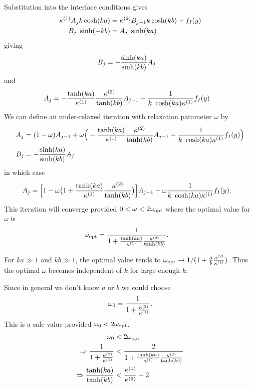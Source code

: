 \documentclass[11pt]{article}
\begin{document}
Substitution into the interface conditions gives
\begin{align*}
   \kappa^{(1)} A_j k \cosh(ka) &=   \kappa^{(2)} B_{j-1} k \cosh(kb) +f_I(y)  \\
    B_j~\sinh(-kb) &= A_j~\sinh(ka)
\end{align*}
giving
\begin{align*}
   B_j &= - {\sinh(ka)\over\sinh(kb)} A_j 
\end{align*}
and 
\begin{align*}
   A_j &= - {\tanh(ka)\over\kappa^{(1)}}{\kappa^{(2)}\over\tanh(kb)} A_{j-1} + {1\over  k~\cosh(ka)\kappa^{(1)}} f_I(y)
\end{align*}
We can define an under-relaxed iteration with relaxation parameter $\omega$ by 
\begin{align*}
   A_j &= (1-\omega)A_{j-1} + 
                  \omega \Big( - {\tanh(ka)\over\kappa^{(1)}}{\kappa^{(2)}\over\tanh(kb)} A_{j-1} + {1\over  k~\cosh(ka)\kappa^{(1)}} f_I(y) \Big) \\
    B_j &= - {\sinh(ka)\over\sinh(kb)} A_j 
\end{align*}
in which case
\begin{align*}
   A_j &= \Big[ 1 -\omega\big(1+{\tanh(ka)\over\kappa^{(1)}}{\kappa^{(2)}\over\tanh(kb)}\big) \Big] A_{j-1} -
                         \omega{ {1\over  k~\cosh(ka)\kappa^{(1)}} f_I(y) }.
\end{align*}
This iteration will converge provided $0< \omega < 2\omega_{\rm opt}$ where
the optimal value for $\omega$ is
\begin{align*}
   \omega_{\rm opt} &= {1 \over 1+{\tanh(ka)\over\kappa^{(1)}}{\kappa^{(2)}\over\tanh(kb)} }.
\end{align*}

For $ka\gg 1 $ and $kb\gg 1$,  the optimal value tends to $\omega_{\rm opt} \rightarrow 1/(1+\frac{a}{b}\frac{\kappa^{(2)}}{\kappa^{(1)}})$.
Thus the optimal $\omega$ becomes independent of $k$ for large enough $k$. 


Since in general we don't know $a$ or $b$ we could choose
\[
   \omega_0 = {1 \over 1+\frac{\kappa^{(2)}}{\kappa^{(1)}} }.
\]
This is a safe value provided $\omega_0< 2\omega_{\rm opt}$.
\begin{align*}
   \omega_0 &< 2 \omega_{\rm opt}\\
\Rightarrow {1 \over 1+\frac{\kappa^{(2)}}{\kappa^{(1)}} }   &< {2 \over 1+{\tanh(ka)\over\kappa^{(1)}}{\kappa^{(2)}\over\tanh(kb)} } \\
\Rightarrow\frac{\tanh(ka)}{\tanh(kb)} &< \frac{\kappa^{(1)}}{\kappa^{(2)}} + 2 
\end{align*}
\end{document}
